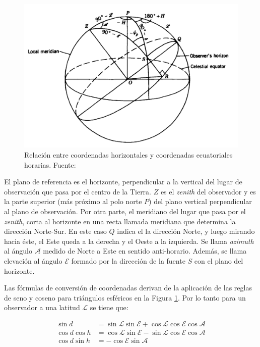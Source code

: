 \begin{figure}[h!]
	\centering
	\includegraphics[scale=0.3]{images/horizontales.png}
	\caption{Relación entre coordenadas horizontales y coordenadas ecuatoriales horarias. Fuente: \citep{libroAstro}}
	\label{fig:horizontal}
\end{figure}

El plano de referencia es el horizonte, perpendicular a la vertical del lugar de observación que pasa por el centro de la Tierra. $Z$ es el \textit{zenith} del observador y es la parte superior (más próximo al polo norte $P$) del plano vertical perpendicular al plano de observación. Por otra parte, el meridiano del lugar que pasa por el \textit{zenith}, corta al horizonte en una recta llamada meridiana que determina la dirección Norte-Sur. En este caso $Q$ indica el la dirección Norte, y luego mirando hacia éste, el Este queda a la derecha y el Oeste a la izquierda. Se llama \textit{azimuth} al ángulo $\mathscr{A}$ medido de Norte a Este en sentido anti-horario. Además, se llama elevación al ángulo $\mathscr{E}$ formado por la dirección de la fuente $S$ con el plano del horizonte.

Las fórmulas de conversión de coordenadas derivan de la aplicación de las reglas de seno y coseno para triángulos esféricos en la Figura \ref{fig:horizontal}. Por lo tanto para un observador a una latitud $\mathscr{L}$ se tiene que:

\begin{align}
	\sin{d}        & = \sin{\mathscr{L}}\sin{\mathscr{E}}+\cos{\mathscr{L}}\cos{\mathscr{E}}\cos{\mathscr{A}} \nonumber \\
	\cos{d}\cos{h} & = \cos{\mathscr{L}}\sin{\mathscr{E}} - \sin{\mathscr{L}}\cos{\mathscr{E}}\cos{\mathscr{A}}         \\
	\cos{d}\sin{h} & = -\cos{\mathscr{E}}\sin{\mathscr{A}} \nonumber
	\label{eq:transformation}
\end{align}

